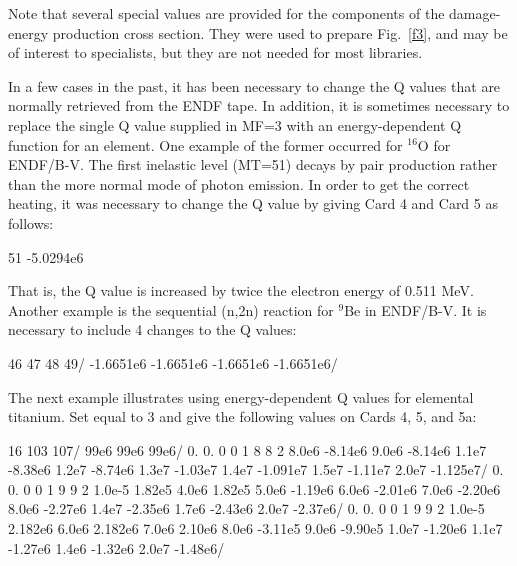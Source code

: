 Note that several special  values are provided for
the components of the damage-energy production cross section.
They were used to prepare Fig.~\ref{f3}, and may be of interest
to specialists, but they are not needed for most libraries.

In a few cases in the past, it has been necessary to change
the Q values that are normally retrieved from the ENDF tape.
In addition, it is sometimes necessary to replace the single
Q value supplied in MF=3 with an energy-dependent Q function
for an element.  One example of the former occurred for $^{16}$O
for ENDF/B-V.  The first inelastic level (MT=51) decays by
pair production rather than the more normal mode of photon
emission.  In order to get the correct heating, it was necessary
to change the Q value by giving Card 4 and Card 5 as follows:

\small
\begin{ccode}

   51
   -5.0294e6

\end{ccode}
\normalsize

\noindent
That is, the Q value is increased by twice the electron energy
of 0.511 MeV.  Another example is the sequential (n,2n)
reaction for $^{9}$Be in ENDF/B-V.  It is necessary to include
4 changes to the Q values:

\small
\begin{ccode}

   46 47 48 49/
   -1.6651e6 -1.6651e6 -1.6651e6 -1.6651e6/

\end{ccode}
\normalsize

\noindent
The next example illustrates using energy-dependent Q values
 for elemental titanium.  Set
 equal to 3 and give the following values on
Cards 4, 5, and 5a:

\small
\begin{ccode}

   16 103 107/
   99e6 99e6 99e6/
   0. 0. 0 0 1 8
   8 2
   8.0e6 -8.14e6 9.0e6 -8.14e6 1.1e7 -8.38e6
   1.2e7 -8.74e6 1.3e7 -1.03e7 1.4e7 -1.091e7
   1.5e7 -1.11e7 2.0e7 -1.125e7/
   0. 0. 0 0 1 9
   9 2
   1.0e-5 1.82e5 4.0e6 1.82e5 5.0e6 -1.19e6
   6.0e6 -2.01e6 7.0e6 -2.20e6 8.0e6 -2.27e6
   1.4e7 -2.35e6 1.7e6 -2.43e6 2.0e7 -2.37e6/
   0. 0. 0 0 1 9
   9 2
   1.0e-5 2.182e6 6.0e6 2.182e6 7.0e6 2.10e6
   8.0e6 -3.11e5 9.0e6 -9.90e5 1.0e7 -1.20e6
   1.1e7 -1.27e6 1.4e6 -1.32e6 2.0e7 -1.48e6/

\end{ccode}
\normalsize

